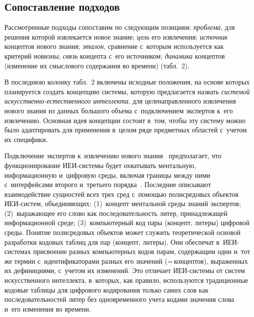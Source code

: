 \begin{multicols}{2}
\section{Сопоставление подходов}

\vspace*{-12pt}

  Рассмотренные подходы сопоставим по следующим позициям: 
\textit{проблема}, для решения которой извлекается новое знание; 
\textit{цель} его извлечения; \textit{источник} концептов нового знания; 
\textit{эталон}, сравнение с~которым используется как критерий новизны; 
\textit{связь} концепта с~его источником; \textit{динамика} концептов 
(изменение их смыслового содержания во времени) (табл.~2).
  

  
  В последнюю колонку табл.~2 включены исходные положения, на основе 
которых планируется создать концепцию системы, которую предлагается 
назвать \textit{системой ис\-кус\-ст\-вен\-но-ес\-тест\-вен\-но\-го 
интеллекта}, для целенаправленного извлечения нового 
знания из данных большого объема с~подключением экспертов к~его 
извлечению. Основная идея концепции состоит в~том, чтобы эту систему 
можно было адаптировать для применения в~целом ряде предметных 
областей с~учетом их специфики.
  
  Подключение экспертов к~извлечению нового знания~\cite{21-z, 22-z} 
предполагает, что функционирование ИЕИ-сис\-те\-мы будет охватывать 
ментальную, информационную и~цифровую среды, включая границы между 
ними с~интерфейсами второго и~треть\-его порядка~\cite{23-z}. Последние 
описывают взаимодействие сущностей всех трех сред с~по\-мощью 
полисредовых объектов ИЕИ-сис\-тем, объеди\-ня\-ющих: (1)~концепт 
ментальной среды знаний экспертов; (2)~выражающее его слово как 
последовательность литер, принадлежащей информационной среде; 
(3)~компьютерный код пары (концепт, литеры) цифровой среды. Понятие 
полисредовых объектов может служить теоретической основой разработки 
кодовых таблиц для пар (концепт, литеры). Они обеспечат  
в~ИЕИ-сис\-те\-мах присвоение разных компьютерных кодов парам, 
содержащим один и~тот же термин с~идентификаторами разных его значений 
(=\,кон\-цеп\-тов), выраженных их дефинициями, с~учетом их изменений. Это 
отличает ИЕИ-сис\-те\-мы от систем искусственного интеллекта, в~которых, 
как правило, используются традиционные кодовые таб\-ли\-цы для цифрового 
кодирования только самих слов как последовательностей литер без 
одновременного учета кодами значения слова и~его изменения во времени.
  


\end{multicols}
